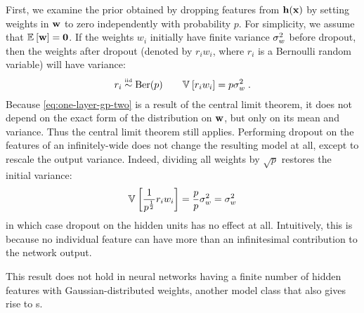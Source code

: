 First, we examine the prior obtained by dropping features from ${\bf{h}}({\bf{x}})$ by setting weights in ${\bf{w}}$ to zero independently with probability $p$.
For simplicity, we assume that $\mathbb{E}_{} \left[ {{\bf{w}}} \right] = {\bf{0}}$.
If the weights $w_i$ initially have finite variance $\sigma^2_{w}$ before dropout, then the weights after dropout (denoted by $r_i w_i$, where $r_i$ is a Bernoulli random variable) will have variance:
%
\begin{align}
r_i \overset{\mbox{\tiny iid}}{\sim} \textnormal{Ber}(p) \qquad
\mathbb{V}_{} \left[ {r_i w_i} \right] = p \sigma_{w}^2 \;.
\end{align}
%
Because \cref{eq:one-layer-gp-two} is a result of the central limit theorem, it does not depend on the exact form of the distribution on ${\bf{w}}$, but only on its mean and variance.
Thus the central limit theorem still applies.
Performing dropout on the features of an infinitely-wide \MLP{} does not change the resulting model at all, except to rescale the output variance.
Indeed, dividing all weights by $\sqrt p$ restores the initial variance:
%
\begin{align}
\mathbb{V}_{} \left[ { \frac{1}{p^\frac{1}{2}} r_i w_i} \right] = \frac{p}{p} \sigma_{w}^2 = \sigma_{w}^2
\end{align}
%
in which case dropout on the hidden units has no effect at all.
Intuitively, this is because no individual feature can have more than an infinitesimal contribution to the network output.

This result does not hold in neural networks having a finite number of hidden features with Gaussian-distributed weights, another model class that also gives rise to \gp{}s.



